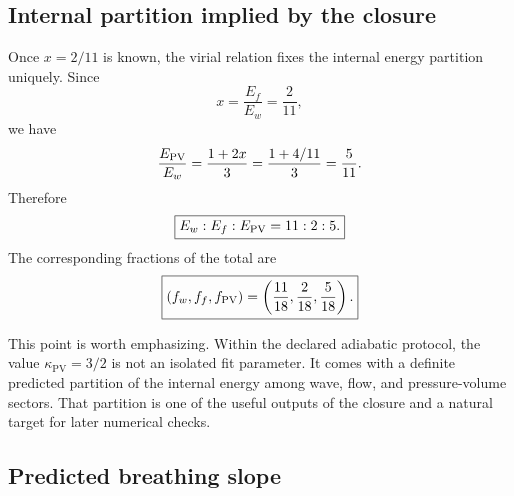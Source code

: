 \documentclass[11pt]{article}
\newcommand{\kPV}{\kappa_{\mathrm{PV}}}
\begin{document}
\subsection{Internal partition implied by the closure}
\label{app:adiabatic-partition}

Once \(x=2/11\) is known, the virial relation fixes the internal energy partition
uniquely. Since
\begin{equation}
x=\frac{E_f}{E_w}=\frac{2}{11},
\end{equation}
we have
\begin{equation}
\frac{E_{\rm PV}}{E_w}
=
\frac{1+2x}{3}
=
\frac{1+4/11}{3}
=
\frac{5}{11}.
\end{equation}
Therefore
\begin{equation}
\boxed{
E_w:E_f:E_{\rm PV}=11:2:5.
}
\label{eq:app-11-2-5}
\end{equation}
The corresponding fractions of the total are
\begin{equation}
\boxed{
(f_w,f_f,f_{\rm PV})
=
\left(
\frac{11}{18},
\frac{2}{18},
\frac{5}{18}
\right).
}
\label{eq:app-partition-fractions}
\end{equation}

This point is worth emphasizing. Within the declared adiabatic protocol, the value
\(\kPV=3/2\) is not an isolated fit parameter. It comes with a definite predicted
partition of the internal energy among wave, flow, and pressure-volume sectors. That
partition is one of the useful outputs of the closure and a natural target for later
numerical checks.

\subsection{Predicted breathing slope}
\label{app:adiabatic-breathing-slope}
\end{document}
